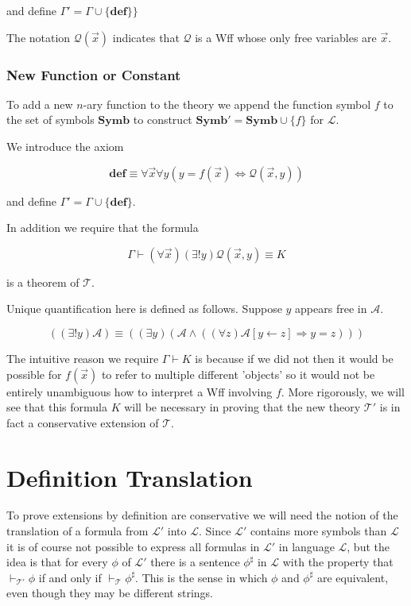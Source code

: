 \documentclass[12pt]{article}
\newcommand{\bv}[1]{\boldsymbol{#1}}
\newcommand{\mc}[1]{\mathcal{#1}}
\newcommand{\bc}[1]{\bv{\mc{#1}}}
\begin{document}
and define $\Gamma' = \Gamma \cup \{\textbf{def}\} \}$

The notation $\mc{Q}(\vec{x})$ indicates that $\mc{Q}$ is a Wff whose only free variables are $\vec{x}$.

\subsubsection*{New Function or Constant}

 To add a new $n$-ary function to the theory we append the function symbol $f$ to the set of symbols $\textbf{Symb}$ to construct $\textbf{Symb}' = \textbf{Symb}\cup\{f\}$ for $\bv{\mc{L}}$.

We introduce the axiom

\begin{equation}
\textbf{def} \equiv \forall \vec{x} \forall y(y=f(\vec{x})\Leftrightarrow \mc{Q}(\vec{x},y))
\end{equation}

and define $\Gamma' = \Gamma \cup \{\textbf{def}\}$.

In addition we require that the formula

\begin{equation}
\Gamma \vdash (\forall \vec{x})(\exists! y) \mc{Q}(\vec{x},y) \equiv K
\end{equation}

is a theorem of $\bc{T}$.

Unique quantification here is defined as follows. Suppose $y$ appears free in $\mc{A}$.

\begin{equation}
((\exists!y)\mc{A}) \equiv ((\exists y)(\mc{A} \land ((\forall z)\mc{A}[y\leftarrow z] \Rightarrow y=z)))
\end{equation}

The intuitive reason we require $\Gamma \vdash K$ is because if we did not then it would be possible for $f(\vec{x})$ to refer to multiple different 'objects' so it would not be entirely unambiguous how to interpret a Wff involving $f$. More rigorously, we will see that this formula $K$ will be necessary in proving that the new theory $\bc{T}'$ is in fact a conservative extension of $\bc{T}$.

\section{Definition Translation}

To prove extensions by definition are conservative we will need the notion of the translation of a formula from $\bv{\mc{L}}'$ into $\bv{\mc{L}}$. Since $\bv{\mc{L}}'$ contains more symbols than $\bv{\mc{L}}$ it is of course not possible to express all formulas in $\bv{\mc{L}}'$ in language $\bv{\mc{L}}$, but the idea is that for every $\phi$ of $\bv{\mc{L}}'$ there is a sentence $\phi^\sharp$ in $\bv{\mc{L}}$ with the property that $\vdash_{\bc{T}'}\phi$ if and only if $\vdash_{\bc{T}}\phi^{\sharp}$. This is the sense in which $\phi$ and $\phi^{\sharp}$ are equivalent, even though they may be different strings.
\end{document}
